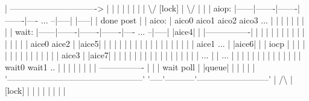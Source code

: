 \begin{DoxyPre}
      |                      ------------------------------->  |              |           |     |        |                                |
      |                     |                                 \textbackslash{}/    [lock]    |          \textbackslash{}/     |        |                                |
aiop: |------|-------|-------|-------|---- ... --|-----|    |-----|           |         done  post       |                                |
aico: | aico0  aico1   aico2   aico3       ...         |    |  |  |           |          |      |        |                                |
wait: |------|-------|-------|-------|---- ... --|-----|    |aice4|           |    |----------------|    |                                |
      |   |              |                             |    |  |  |           |    |                |    |                                |
      | aice0           aice2                          |    |aice5|           |    |                |    |                                |
      |   |              |                             |    |  |  |           |    |                |    |                                |
      | aice1           ...                            |    |aice6|           |    |      iocp      |    |                                |
      |   |                                            |    |  |  |           |    |                |    |                                |
      | aice3                                          |    |aice7|           |    |                |    |                                |
      |   |                                            |    |  |  |           |    |                |    |                                |
      |  ...                                           |    | ... |           |    |                |    |                                |
      |   |                                            |    |  |  |           |    | wait0 wait1 .. |    |                                |
      |                                                |    |     |           |     ----------------     |                                |
      |                 wait poll                      |    |queue|           |      |         |         |                                |
      '------------------------------------------------'    '-----'-----------'--------------------------'                                |
                            /\textbackslash{}                                 |    [lock]           |         |                                          |
                            |                                  |                     |         |                                          |              

\end{DoxyPre}
